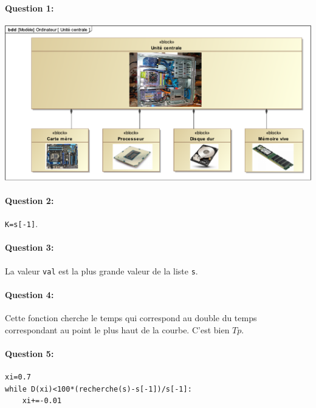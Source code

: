 \paragraph{Question 1:}

\begin{center}
 \includegraphics[width=0.9\linewidth]{img/unite_centrale_corrige}
\end{center}

\paragraph{Question 2:}

\verb?K=s[-1]?.

\paragraph{Question 3:}

La valeur \verb?val? est la plus grande valeur de la liste \verb?s?.

\paragraph{Question 4:}

Cette fonction cherche le temps qui correspond au double du temps correspondant au point le plus haut de la courbe. C'est bien $Tp$.

\paragraph{Question 5:}

\begin{center}
\begin{verbatim}
xi=0.7
while D(xi)<100*(recherche(s)-s[-1])/s[-1]:
    xi+=-0.01
\end{verbatim}
\end{center}

